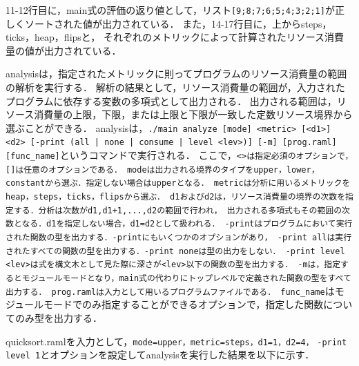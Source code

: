 \documentclass{kuisthesis}
\begin{document}
11-12行目に，main式の評価の返り値として，リスト{\tt [9;8;7;6;5;4;3;2;1]}が正しくソートされた値が出力されている．
また，14-17行目に，上からsteps，ticks，heap，flipsと，
それぞれのメトリックによって計算されたリソース消費量の値が出力されている．

analysisは，指定されたメトリックに則ってプログラムのリソース消費量の範囲の解析を実行する．
解析の結果として，リソース消費量の範囲が，入力されたプログラムに依存する変数の多項式として出力される．
出力される範囲は，リソース消費量の上限，下限，または上限と下限が一致した定数リソース境界から選ぶことができる．
analysisは，{\tt ./main analyze [mode] <metric> [<d1>] <d2> [-print (all | none | consume | level <lev>)] [-m] [prog.raml]} \\ {\tt [func\_name]}というコマンドで実行される．
ここで，{\tt <>は指定必須のオプションで，[]は任意のオプションである．
modeは出力される境界のタイプをupper，lower，constantから選ぶ．指定しない場合はupperとなる．
metricは分析に用いるメトリックをheap，steps，ticks，flipsから選ぶ．
d1およびd2は，リソース消費量の境界の次数を指定する．分析は次数がd1,d1+1,...,d2の範囲で行われ，
出力される多項式もその範囲の次数となる．d1を指定しない場合，d1=d2として扱われる．
-printはプログラムにおいて実行された関数の型を出力する．-printにもいくつかのオプションがあり，
-print allは実行されたすべての関数の型を出力する．-print noneは型の出力をしない．
-print level <lev>は式を構文木として見た際に深さが<lev>以下の関数の型を出力する．
-mは，指定するとモジュールモードとなり，main式の代わりにトップレベルで定義された関数の型をすべて出力する．
prog.ramlは入力として用いるプログラムファイルである．
func\_name}はモジュールモードでのみ指定することができるオプションで，指定した関数についてのみ型を出力する．

quicksort.ramlを入力として，{\tt mode=upper，metric=steps，d1=1，d2=4，}
{\tt -print level 1}とオプションを設定してanalysisを実行した結果を以下に示す．
\end{document}
